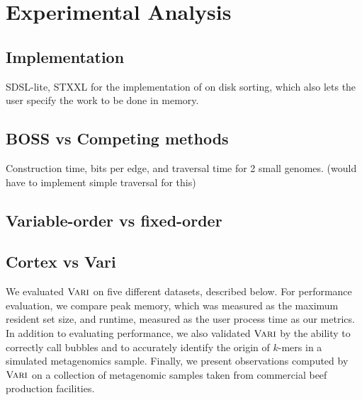 \chapter{Experimental Analysis}
\label{sec:experiments}

\section{Implementation}
SDSL-lite, STXXL for the implementation of on disk sorting, which also lets the user specify the work to be done in memory.


\section{BOSS vs Competing methods}
Construction time, bits per edge, and traversal time for 2 small genomes.
(would have to implement simple traversal for this)

\section{Variable-order vs fixed-order}



\section{Cortex vs Vari}


We evaluated $\mbox{\rm {\sc Vari}}$ on five different datasets, described below.  For performance evaluation, we compare peak memory, which was measured as the maximum resident set size, and runtime, measured as the user process time as our metrics.  In addition to evaluating performance, we also validated $\mbox{\rm {\sc Vari}}$ by the ability to correctly call bubbles and to accurately identify the origin of $k$-mers in a simulated metagenomics sample.  Finally, we present observations computed by $\mbox{\rm {\sc Vari}}$ on a collection of metagenomic samples taken from commercial beef production facilities.



